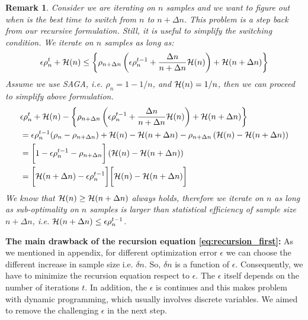 \documentclass{article}
\newtheorem{remark}[definition]{Remark}
\newcommand{\bound}{{\cal H}}
\begin{document}
%
\begin{remark}
 Consider we are iterating on $n$ samples and we want to figure out when is the
 best time to switch from $n$ to $n+\Delta n$. This problem is a step back from
 our recursive formulation. Still, it is useful to simplify the switching
 condition. We iterate on $n$ samples as long as: 
 \begin{equation*}
		\epsilon \rho_n^t + \bound(n) \leq \left\{ \rho_{n+\Delta
		n}\left( \epsilon \rho_{n}^{t-1} + \frac{\Delta n}{ n + \Delta n} \bound(n)  
		\right)+\bound(n + \Delta n) \right\} 
	\end{equation*}
Assume we use SAGA, i.e. $\rho_n = 1-1/n$, and $\bound(n) = 1/n$, then we can
proceed to simplify above formulation. 
\begin{eqnarray*}
		& \epsilon \rho_n^t + \bound(n) - \left\{ \rho_{n+\Delta
		n}\left( \epsilon \rho_{n}^{t-1} + \frac{\Delta n}{ n + \Delta n} \bound(n)  
		\right)+\bound(n + \Delta n) \right\} \\ 
		& = \epsilon \rho_n^{t-1} (\rho_n - \rho_{n+\Delta n}) +\bound(n)
		-\bound(n+\Delta n) -\rho_{n + \Delta n	} \left( \bound(n) - \bound(n+ \Delta
		n) \right) \\ 
		& = \bigg[1 -\epsilon \rho_n^{t-1} -\rho_{n+\Delta n}\bigg]\left( \bound(n) -
		\bound(n + \Delta n) \right) \\ 
		& = \bigg[\bound(n+\Delta n) - \epsilon \rho_n^{t-1}\bigg] \bigg[ \bound(n) -
		\bound(n + \Delta n)\bigg]
	\end{eqnarray*} 
We know that $\bound(n) \geq \bound(n + \Delta n)$ always holds, therefore we
iterate on $n$ as long as sub-optimality on $n$ samples is larger than
statistical efficiency of sample size $n + \Delta n$, i.e. $\bound(n + \Delta n)
\leq \epsilon \rho_n^{t-1}$.
\end{remark}
\textbf{ The main drawback of the recursion equation \ref{eq:recursion_first}:}
As we mentioned in appendix, for different optimization error $\epsilon$ we can
choose the different increase in sample size i.e. $\delta n$. So, $\delta n$ is a
function of $\epsilon$. Consequently, we have to minimize the recursion equation
respect to $\epsilon$. The $\epsilon$ itself depends on the number of
iterations $t$. In addition, the $\epsilon$ is continues and this makes 
problem with dynamic programming, which usually involves discrete variables.
We aimed to remove the challenging $\epsilon$ in the next step. 
\end{document}
